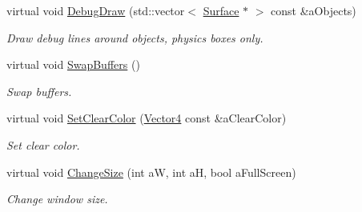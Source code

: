 \begin{DoxyCompactItemize}
virtual void \hyperlink{classPCShaderScreen_affdddd22ec40502de7512ba0466f5310}{Debug\+Draw} (std\+::vector$<$ \hyperlink{classSurface}{Surface} $\ast$ $>$ const \&a\+Objects)
\begin{DoxyCompactList}\small\item\em Draw debug lines around objects, physics boxes only. \end{DoxyCompactList}\item 
virtual void \hyperlink{classPCShaderScreen_a32d9adc0a0af5c3e22f5d06005e427a6}{Swap\+Buffers} ()
\begin{DoxyCompactList}\small\item\em Swap buffers. \end{DoxyCompactList}\item 
virtual void \hyperlink{classPCShaderScreen_ac1b9a286f7b8d6e3d6e37fe1f0f6a5a7}{Set\+Clear\+Color} (\hyperlink{structVector4}{Vector4} const \&a\+Clear\+Color)
\begin{DoxyCompactList}\small\item\em Set clear color. \end{DoxyCompactList}\item 
virtual void \hyperlink{classPCShaderScreen_aab52b03029fa67c43406b3e0af1ad16a}{Change\+Size} (int aW, int aH, bool a\+Full\+Screen)
\begin{DoxyCompactList}\small\item\em Change window size. \end{DoxyCompactList}\end{DoxyCompactItemize}
